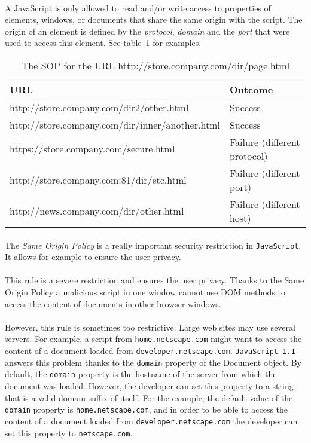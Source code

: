 \paragraph{}
    A JavaScript is only allowed to read and/or write access to properties of elements, windows, or documents that share the same origin with the script. The origin of an element is defined by the \emph{protocol}, \emph{domain} and the \emph{port} that were used to access this element. See table~\ref{SOP} for examples. %
\begin{table}[h!]
\begin{tabular}{|l|l|}
      \hline
      URL & Outcome\\
      \hline\hline
    http://store.company.com/dir2/other.html        & Success \\
    http://store.company.com/dir/inner/another.html & Success \\
    https://store.company.com/secure.html           & Failure (different protocol) \\
    http://store.company.com:81/dir/etc.html        & Failure (different port) \\
    http://news.company.com/dir/other.html          & Failure (different host) \\      
      \hline
\end{tabular}
\caption{The SOP for the URL http://store.company.com/dir/page.html}\label{SOP}
\end{table}

\paragraph{}
The \emph{Same Origin Policy} is a really important security restriction in \texttt{JavaScript}. It allows for example to ensure the user privacy. %

\paragraph{}
This rule is a severe restriction and ensures the user privacy. Thanks to the Same Origin Policy a malicious script in one window cannot use DOM methods to access the content of documents in other browser windows. %

\paragraph{}
However, this rule is sometimes too restrictive. Large web sites may use several servers. For example, a script from \texttt{home.netscape.com} might want to access the content of a document loaded from \texttt{developer.netscape.com}. \texttt{JavaScript 1.1} answers this problem thanks to the \texttt{domain} property of the Document object. By default, the \texttt{domain} property is the hostname of the server from which the document was loaded. However, the developer can set this property to a string that is a valid domain suffix of itself. For the example, the default value of the \texttt{domain} property is \texttt{home.netscape.com}, and in order to be able to access the content of a document loaded from \texttt{developer.netscape.com} the developer can set this property to \texttt{netscape.com}.
